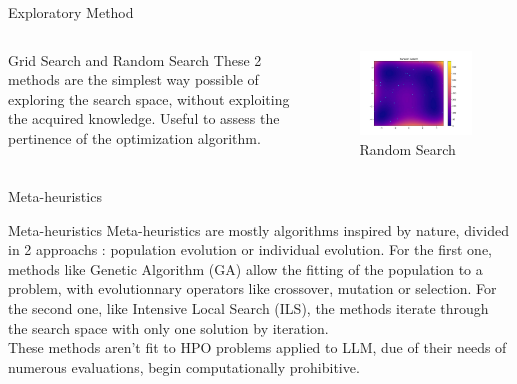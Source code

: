 \begin{frame}{Exploratory Method}
    \begin{columns}
        \begin{column}{0.5\textwidth}
            \begin{block}{Grid Search and Random Search}
                These 2 methods are the simplest way possible of exploring the search space, without exploiting the acquired knowledge. Useful to assess the pertinence of the optimization algorithm.        
            \end{block}
        \end{column}

        \begin{column}{0.5\textwidth}
            \begin{figure}
                \centering
                \includegraphics[width=\linewidth]{imgs/plots/random_search.jpg}
                \caption{Random Search}
            \end{figure}
        \end{column}
    \end{columns}
\end{frame}

\begin{frame}{Meta-heuristics}

    \begin{block}{Meta-heuristics}
        Meta-heuristics are mostly algorithms inspired by nature, divided in 2 approachs : population evolution or individual evolution. For the first one, methods like Genetic Algorithm (GA) allow the fitting of the population to a problem, with evolutionnary operators like crossover, mutation or selection. For the second one, like Intensive Local Search (ILS), the methods iterate through the search space with only one solution by iteration. \\
        These methods aren't fit to HPO problems applied to LLM, due of their needs of numerous evaluations, begin computationally prohibitive. 
        
    \end{block}
    
\end{frame}

